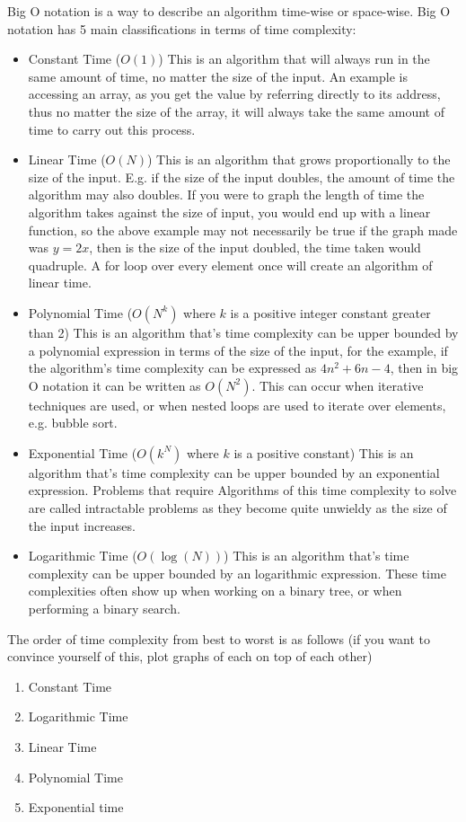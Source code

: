   \noindent
  Big O notation is a way to describe an algorithm time-wise or space-wise. Big O notation has 5 main classifications in terms of time complexity:
  \begin{itemize}
  	\item Constant Time ($O(1)$)
	  	\subitem This is an algorithm that will always run in the same amount of time, no matter the size of the input. An example is accessing an array, as you get the value by referring directly to its address, thus no matter the size of the array, it will always take the same amount of time to carry out this process.
  	\item Linear Time ($O(N)$)
	  	\subitem This is an algorithm that grows proportionally to the size of the input. E.g. if the size of the input doubles, the amount of time the algorithm may also doubles. If you were to graph the length of time the algorithm takes against the size of input, you would end up with a linear function, so the above example may not necessarily be true if the graph made was $y=2x$, then is the size of the input doubled, the time taken would quadruple. A for loop over every element once will create an algorithm of linear time.
  	\item Polynomial Time ($O(N^k)$ where $k$ is a positive integer constant greater than 2)
	  	\subitem This is an algorithm that's time complexity can be upper bounded by a polynomial expression in terms of the size of the input, for the example, if the algorithm's time complexity can be expressed as $4n^2 + 6n - 4$, then in big O notation it can be written as $O(N^2)$. This can occur when iterative techniques are used, or when nested loops are used to iterate over elements, e.g. bubble sort.
  	\item Exponential Time ($O(k^N)$ where $k$ is a positive constant)
	  	\subitem This is an algorithm that's time complexity can be upper bounded by an exponential expression. Problems that require Algorithms of this time complexity to solve are called intractable problems as they become quite unwieldy as the size of the input increases.  	
  	\item Logarithmic Time ($O(\log(N))$)
	  	\subitem This is an algorithm that's time complexity can be upper bounded by an logarithmic expression. These time complexities often show up when working on a binary tree, or when performing a binary search.
  \end{itemize}
  
  The order of time complexity from best to worst is as follows (if you want to convince yourself of this, plot graphs of each on top of each other)
  \begin{enumerate}
  	\item Constant Time
  	\item Logarithmic Time
  	\item Linear Time
  	\item Polynomial Time
  	\item Exponential time
  \end{enumerate}
  
